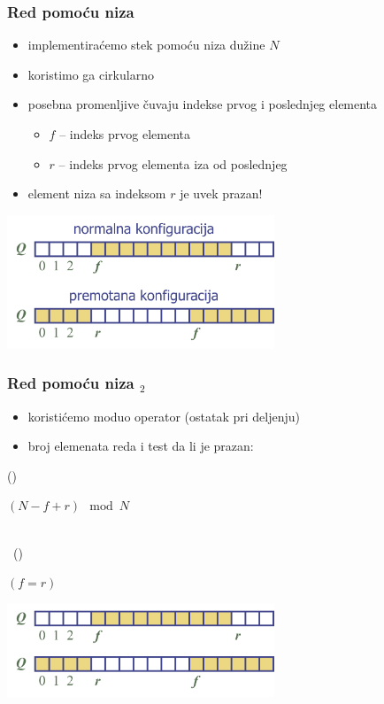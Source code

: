 \documentclass[compress]{beamer}
\begin{document}
\begin{frame}[fragile]
  \frametitle{Red pomoću niza}
  \begin{itemize}
    \item implementiraćemo stek pomoću niza dužine $N$
    \item koristimo ga cirkularno
    \item posebna promenljive čuvaju indekse prvog i poslednjeg elementa
    \begin{itemize}
      \item $f$ -- indeks prvog elementa
      \item $r$ -- indeks prvog elementa iza od poslednjeg
    \end{itemize}
    \item element niza sa indeksom $r$ je uvek prazan!      
  \end{itemize}
  \begin{center}
    \includegraphics[width=8cm]{asp-06-pic01.png}
  \end{center}
\end{frame}

\begin{frame}[fragile]
  \frametitle{Red pomoću niza $_2$}
  \begin{itemize}
    \item koristićemo moduo operator (ostatak pri deljenju)
    \item broj elemenata reda i test da li je prazan:
  \end{itemize}
()
\begin{algorithmic}
\RETURN $(N-f+r) \mod N$
\end{algorithmic}
\ \\ \ 
()
\begin{algorithmic}
\RETURN $(f=r)$
\end{algorithmic}
\begin{center}
  \includegraphics[width=8cm]{asp-06-pic02.png}
\end{center}
\end{frame}
\end{document}

